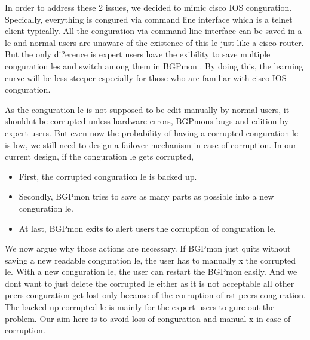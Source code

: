 In order to address these 2 issues, we decided to mimic cisco IOS conguration. Specically, everything is congured via command line interface which is a telnet client typically. All the conguration via command line interface can be saved in a le and normal users are unaware of the existence of this le just like a cisco router. But the only di?erence is expert users have the exibility to save multiple conguration les and switch among them in BGPmon . By doing this, the learning curve will be less steeper especially for those who are familiar with cisco IOS conguration.

As the conguration le is not supposed to be edit manually by normal users, it shouldnt be corrupted unless hardware errors, BGPmons bugs and edition by expert users. But even now the probability of having a corrupted
conguration le is low, we still need to design a failover mechanism in case of corruption. In our current design, if the conguration le gets corrupted,
 \begin{itemize}
	 	\item{ First, the corrupted conguration le is backed up.}
		\item{Secondly, BGPmon tries to save as many parts as possible into a new conguration le.}
		\item{ At last, BGPmon exits to alert users the corruption of conguration le.}
\end{itemize} 

We now argue why those actions are necessary. If BGPmon just quits without saving a new readable conguration le, the user has to manually x the corrupted le. With a new conguration le, the user can restart 
the BGPmon easily. And we dont want to just delete the corrupted le either as it is not acceptable all other peers conguration get lost only because of the corruption of rst peers conguration. 
The backed up corrupted le is mainly for the expert users to gure out the problem. Our aim here is to avoid loss of conguration and manual x in case of corruption.


